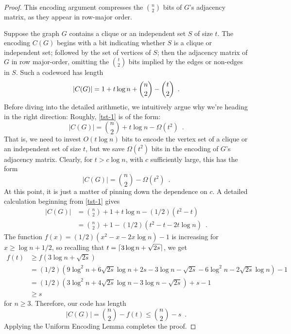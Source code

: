 \documentclass[format=acmsmall, review=false, screen=true]{acmart}
\begin{document}
\begin{proof}
  This encoding argument compresses the $\binom{n}{2}$ bits
  of $G$'s adjacency matrix, as they appear in row-major order.
  
  Suppose the graph $G$ contains a clique or an independent set $S$ of size
  $t$. The encoding $C(G)$ begins with a bit indicating whether $S$
  is a clique or independent set; followed by the set of vertices of $S$; 
  then the
  adjacency matrix of $G$ in row major-order, omitting
  the $\binom{t}{2}$ bits implied by the edges or non-edges in
  $S$. Such a codeword has length
  \begin{equation} 
    |C(G)|  = 1 + t\log n + \binom{n}{2}-\binom{t}{2} \enspace .  
    \eqlabel{tst-1}
  \end{equation}
  Before diving into the detailed arithmetic, we intuitively
  argue why we're heading in the right direction: Roughly,
  \eqref{tst-1} is of the form:
  \[ |C(G)|  = \binom{n}{2} + t\log n - \varOmega(t^2) \enspace . \]
  That is, we need to invest $O(t\log n)$ bits
  to encode the vertex set of a clique or an independent set of 
  size $t$, but we save $\varOmega(t^2)$ bits in the encoding of $G$'s 
  adjacency matrix.
  Clearly, for $t>c\log n$, with $c$ sufficiently large, this has the form 
  \[ |C(G)|  = \binom{n}{2} - \varOmega(t^2) \enspace . \]
  At this point, it is just a matter of pinning down the dependence on $c$.
  A detailed calculation beginning from \eqref{tst-1} gives
  \begin{align*}
    |C(G)| 
    & = \binom{n}{2} + 1 + t\log n - (1/2)(t^2 - t) \\
    & = \binom{n}{2} + 1 - (1/2)(t^2 - t - 2t \log n) \enspace .
  \end{align*}
  The function $f(x) = (1/2)(x^2 - x - 2x \log n) - 1$ is increasing
  for $x \geq \log n + 1/2$, so recalling that
$t = {\lceil 3\log n + \sqrt{2s} \rceil}$, we get
  \begin{align*}
    f(t) &\ge f(3\log n + \sqrt{2s}) \\
    &= (1/2)(9 \log^2 n + 6 \sqrt{2s} \log n + 2s - 3 \log n - \sqrt{2s} - 6 \log^2 n - 2 \sqrt{2s} \log n) - 1 \\
    &= (1/2)(3 \log^2 n + 4 \sqrt{2s} \log n - 3 \log n - \sqrt{2s}) + s - 1 \\
    &\ge s
  \end{align*}
  for $n \ge 3$. Therefore, our code has length
  \[
    |C(G)| = \binom{n}{2} - f(t) \le \binom{n}{2} - s \enspace .
  \]
  Applying the Uniform Encoding Lemma completes the proof.
\end{proof}
\end{document}
